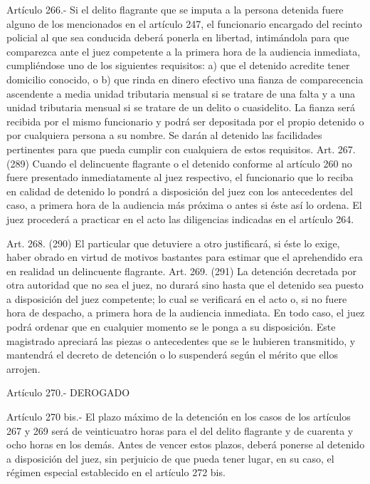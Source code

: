     Artículo 266.- Si el delito flagrante que se imputa a la persona detenida fuere alguno de los mencionados en el artículo 247, el funcionario encargado del recinto policial al que sea conducida deberá ponerla en libertad, intimándola para que comparezca ante el juez competente a la primera hora de la audiencia inmediata, cumpliéndose uno de los siguientes requisitos: a) que el detenido acredite tener domicilio conocido, o b) que rinda en dinero efectivo una fianza de comparecencia ascendente a media unidad tributaria mensual si se tratare de una falta y a una unidad tributaria mensual si se tratare de un delito o cuasidelito. La fianza será recibida por el mismo funcionario y podrá ser depositada por el propio detenido o por cualquiera persona a su nombre.
    Se darán al detenido las facilidades pertinentes para que pueda cumplir con cualquiera de estos requisitos.
    Art. 267. (289) Cuando el delincuente flagrante o el detenido conforme al artículo 260 no fuere presentado inmediatamente al juez respectivo, el funcionario que lo reciba en calidad de detenido lo pondrá a disposición del juez con los antecedentes del caso, a primera hora de la audiencia más próxima o antes si éste así lo ordena.
    El juez procederá a practicar en el acto las diligencias indicadas en el artículo 264.

    Art. 268. (290) El particular que detuviere a otro justificará, si éste lo exige, haber obrado en virtud de motivos bastantes para estimar que el aprehendido era en realidad un delincuente flagrante.
    Art. 269. (291) La detención decretada por otra autoridad que no sea el juez, no durará sino hasta que el detenido sea puesto a disposición del juez competente; lo cual se verificará en el acto o, si no fuere hora de despacho, a primera hora de la audiencia inmediata.
    En todo caso, el juez podrá ordenar que en cualquier momento se le ponga a su disposición.
    Este magistrado apreciará las piezas o antecedentes que se le hubieren transmitido, y mantendrá el decreto de detención o lo suspenderá según el mérito que ellos arrojen.

    Artículo 270.- DEROGADO

    Artículo 270 bis.- El plazo máximo de la detención en los casos de los artículos 267 y 269 será de veinticuatro horas para el del delito flagrante y de cuarenta y ocho horas en los demás.
    Antes de vencer estos plazos, deberá ponerse al detenido a disposición del juez, sin perjuicio de que pueda tener lugar, en su caso, el régimen especial establecido en el artículo 272 bis.


